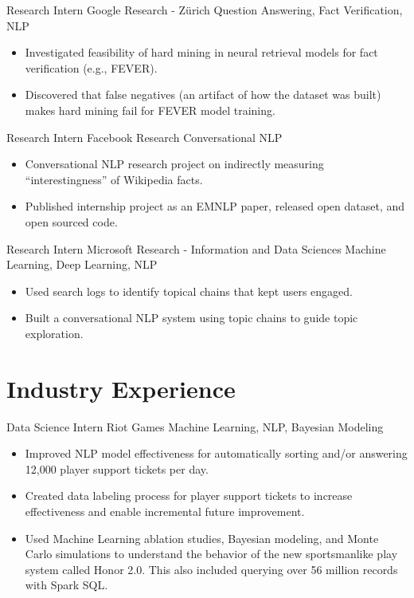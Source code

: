 \documentclass[11pt,a4paper,sans]{moderncv} %
\begin{document}
		{Research Intern}
		{Google Research - Z\"urich}
		{Question Answering, Fact Verification, NLP}
		{}
		{
			\begin{itemize}
				\item Investigated feasibility of hard mining in neural retrieval models for fact verification (e.g., FEVER).
				\item Discovered that false negatives (an artifact of how the dataset was built) makes hard mining fail for FEVER model training.
			\end{itemize}
		}

		{Research Intern}
		{Facebook Research}
		{Conversational NLP}
		{}
		{
			\begin{itemize}
				\item Conversational NLP research project on indirectly measuring ``interestingness'' of Wikipedia facts.
				\item Published internship project as an EMNLP paper, released open dataset, and open sourced code.
			\end{itemize}
		}

		{Research Intern}
		{Microsoft Research - Information and Data Sciences}
		{Machine Learning, Deep Learning, NLP}
		{}
		{
			\begin{itemize}
			\item Used search logs to identify topical chains that kept users engaged.
			\item Built a conversational NLP system using topic chains to guide topic exploration.
			\end{itemize}
		}

\section{Industry Experience}
		{Data Science Intern}
		{Riot Games}
		{Machine Learning, NLP, Bayesian Modeling}
		{}
		{
			\begin{itemize}
			\item Improved NLP model effectiveness for automatically sorting and/or answering 12,000 player support tickets per day.
			\item Created data labeling process for player support tickets to increase effectiveness and enable incremental future improvement.
			\item Used Machine Learning ablation studies, Bayesian modeling, and Monte Carlo simulations to understand the behavior of the new sportsmanlike play system called Honor 2.0. This also included querying over 56 million records with Spark SQL.
			\end{itemize}
		}
\end{document}
